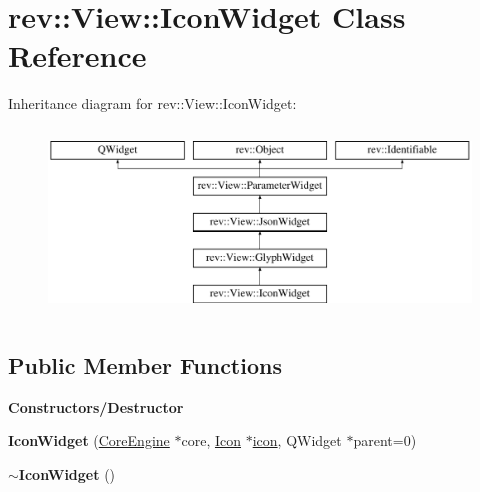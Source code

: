 \hypertarget{classrev_1_1_view_1_1_icon_widget}{}\section{rev\+::View\+::Icon\+Widget Class Reference}
\label{classrev_1_1_view_1_1_icon_widget}
Inheritance diagram for rev\+::View\+::Icon\+Widget\+:\begin{figure}[H]
\begin{center}
\leavevmode
\includegraphics[height=5.000000cm]{classrev_1_1_view_1_1_icon_widget}
\end{center}
\end{figure}
\subsection*{Public Member Functions}
\begin{Indent}\textbf{ Constructors/\+Destructor}\par
\begin{DoxyCompactItemize}
\item 
\mbox{\label{classrev_1_1_view_1_1_icon_widget_ad624d972befa90a7702f0c3e6d24fde8}} 
{\bfseries Icon\+Widget} (\mbox{\hyperlink{classrev_1_1_core_engine}{Core\+Engine}} $\ast$core, \mbox{\hyperlink{classrev_1_1_icon}{Icon}} $\ast$\mbox{\hyperlink{classrev_1_1_view_1_1_icon_widget_a297104c3b88419d7607e964ee4c845b4}{icon}}, Q\+Widget $\ast$parent=0)
\item 
\mbox{\label{classrev_1_1_view_1_1_icon_widget_ab3aed07e6035d251fea5891756a9af81}} 
{\bfseries $\sim$\+Icon\+Widget} ()
\end{DoxyCompactItemize}
\end{Indent}
